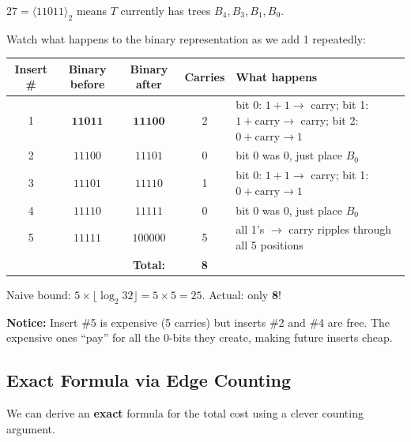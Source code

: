 \documentclass[11pt]{article}
\begin{document}
\begin{examplebox}[5 Successive Inserts into $|T|=27$]
$27 = \langle 11011 \rangle_2$ means $T$ currently has trees $B_4, B_3, B_1, B_0$.

Watch what happens to the binary representation as we add 1 repeatedly:

\begin{center}
\renewcommand{\arraystretch}{1.4}
\begin{tabular}{c|c|c|c|l}
\textbf{Insert \#} & \textbf{Binary before} & \textbf{Binary after} & \textbf{Carries} & \textbf{What happens} \\
\hline
1 & $\mathbf{11011}$ & $\mathbf{11100}$ & \textcolor{rustW}{2} & bit 0: $1+1 \to$ carry; bit 1: $1+\text{carry} \to$ carry; bit 2: $0+\text{carry} \to 1$ \\
2 & $11100$ & $11101$ & \textcolor{greenO}{0} & bit 0 was 0, just place $B_0$ \\
3 & $11101$ & $11110$ & \textcolor{rustW}{1} & bit 0: $1+1 \to$ carry; bit 1: $0+\text{carry} \to 1$ \\
4 & $11110$ & $11111$ & \textcolor{greenO}{0} & bit 0 was 0, just place $B_0$ \\
5 & $11111$ & $100000$ & \textcolor{rustW}{5} & all 1's $\to$ carry ripples through all 5 positions \\
\hline
& & \textbf{Total:} & \textcolor{rustW}{\textbf{8}} & \\
\end{tabular}
\end{center}

Naive bound: $5 \times \lfloor \log_2 32 \rfloor = 5 \times 5 = 25$. Actual: only \textbf{8}!

\textbf{Notice:} Insert \#5 is expensive (5 carries) but inserts \#2 and \#4 are free. The expensive ones ``pay'' for all the 0-bits they create, making future inserts cheap.
\end{examplebox}

\subsection{Exact Formula via Edge Counting}

We can derive an \textbf{exact} formula for the total cost using a clever counting argument.
\end{document}
